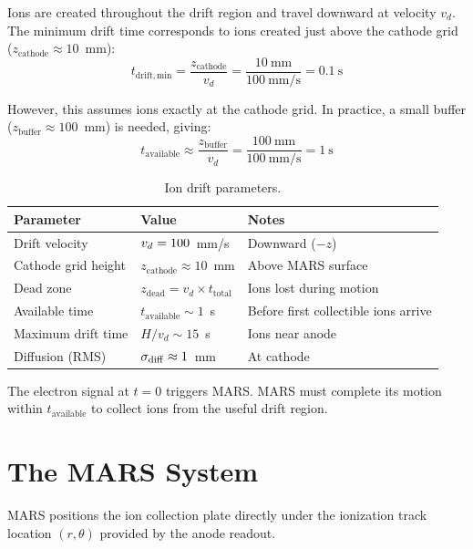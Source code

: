 \documentclass[11pt,a4paper]{article}
\begin{document}
Ions are created throughout the drift region and travel downward at velocity $v_d$.
The minimum drift time corresponds to ions created just above the cathode grid
($z_\mathrm{cathode} \approx 10$~mm):
\begin{equation}
  t_\mathrm{drift,min} = \frac{z_\mathrm{cathode}}{v_d} = \frac{10~\text{mm}}{100~\text{mm/s}} = 0.1~\text{s}
\end{equation}

However, this assumes ions exactly at the cathode grid. In practice, a small
buffer ($z_\mathrm{buffer} \approx 100$~mm) is needed, giving:
\begin{equation}
  t_\mathrm{available} \approx \frac{z_\mathrm{buffer}}{v_d} = \frac{100~\text{mm}}{100~\text{mm/s}} = 1~\text{s}
\end{equation}

\begin{table}[H]
\centering
\caption{Ion drift parameters.}
\begin{tabular}{lll}
\toprule
Parameter & Value & Notes \\
\midrule
Drift velocity & $v_d = 100$~mm/s & Downward ($-z$) \\
Cathode grid height & $z_\mathrm{cathode} \approx 10$~mm & Above MARS surface \\
Dead zone & $z_\mathrm{dead} = v_d \times t_\mathrm{total}$ & Ions lost during motion \\
Available time & $t_\mathrm{available} \sim 1$~s & Before first collectible ions arrive \\
Maximum drift time & $H/v_d \sim 15$~s & Ions near anode \\
Diffusion (RMS) & $\sigma_\mathrm{diff} \approx 1$~mm & At cathode \\
\bottomrule
\end{tabular}
\end{table}

The electron signal at $t = 0$ triggers MARS. MARS must complete its motion
within $t_\mathrm{available}$ to collect ions from the useful drift region.


\section{The MARS System}
\label{sec:mars}

MARS positions the ion collection plate directly under the ionization track
location $(r, \theta)$ provided by the anode readout.
\end{document}
